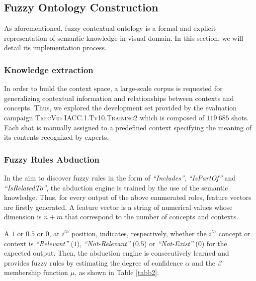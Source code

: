 	\subsection{Fuzzy Ontology Construction}
		 As aforementioned, fuzzy contextual ontology is a formal and explicit representation 
		of semantic knowledge in visual domain. In this section, we will detail its implementation process.
		
		\subsubsection{Knowledge extraction}
		In order to build the context space, a large-scale corpus is requested for generalizing
		contextual information and relationships between contexts and concepts. Thus, 
		we explored the development  set provided by the evaluation campaign \textsc{TrecVid}
		\textsc{IACC.1.Tv10.Training2} which is composed of $119~685$ shots. Each shot is manually
		assigned to a predefined context specifying the meaning of its contents recognized by experts. 
		
		\subsubsection{Fuzzy Rules Abduction}
		In the aim to discover fuzzy rules in the form of \textit{“Includes”}, \textit{“IsPartOf”} 
		and \textit{“IsRelatedTo”}, the abduction engine is trained by the use of the semantic
		knowledge. Thus, for every output of the above enumerated roles, feature vectors are 
		firstly generated.  A feature vector is a string of numerical values whose dimension
		is  $n + m$ that correspond to the number of concepts and contexts. 

		A $1$ or $0.5$ or $0$, at $i^{th}$ position, indicates, respectively, whether 
		the $i^{th}$ concept or context is \textit{“Relevant”} ($1$), \textit{“Not-Relevant”} 
		($0.5$) or \textit{“Not-Exist”} ($0$) for the expected output. Then, the abduction engine is 
		consecutively learned and provides fuzzy rules by estimating the 
		degree of confidence $\alpha$ and the $\beta$ membership function $\mu$, as shown in Table \ref{tabb2}.

